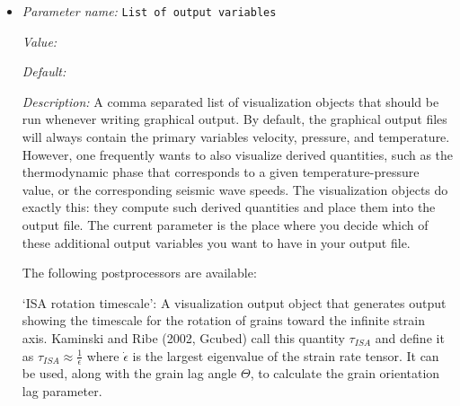 \begin{itemize}
The effect of using this option can be seen in the following picture showing a variation of the output produced with the input files from Section~\ref{sec:shell-simple-2d}:

\begin{center}  \texttt{[image: viz/parameters/build-patches]}\end{center}Here, the left picture shows one visualization cell per computational cell (i.e., the option is switch off, as is the default), and the right picture shows the same simulation with the option switched on. The images show the same data, demonstrating that interpolating the solution onto bilinear shape functions as is commonly done in visualizing data loses information.

Of course, activating this option also greatly increases the amount of data \aspect{} will write to disk: approximately by a factor of 4 in 2d, and a factor of 8 in 3d, when using quadratic elements for the velocity, and correspondingly more for even higher order elements.


{\it Possible values:} A boolean value (true or false)
\item {\it Parameter name:} {\tt List of output variables}
\label{parameters:Postprocess/Visualization/List of output variables}


{\it Value:} 


{\it Default:} 


{\it Description:} A comma separated list of visualization objects that should be run whenever writing graphical output. By default, the graphical output files will always contain the primary variables velocity, pressure, and temperature. However, one frequently wants to also visualize derived quantities, such as the thermodynamic phase that corresponds to a given temperature-pressure value, or the corresponding seismic wave speeds. The visualization objects do exactly this: they compute such derived quantities and place them into the output file. The current parameter is the place where you decide which of these additional output variables you want to have in your output file.

The following postprocessors are available:

`ISA rotation timescale': A visualization output object that generates output showing the timescale for the rotation of grains toward the infinite strain axis. Kaminski and Ribe (2002, Gcubed) call this quantity $\tau_{ISA}$ and define it as $\tau_{ISA} \approx \frac{1}{\dot{\epsilon}}$ where $\dot{\epsilon}$ is the largest eigenvalue of the strain rate tensor. It can be used, along with the grain lag angle $\Theta$, to calculate the grain orientation lag parameter.


\end{itemize}
